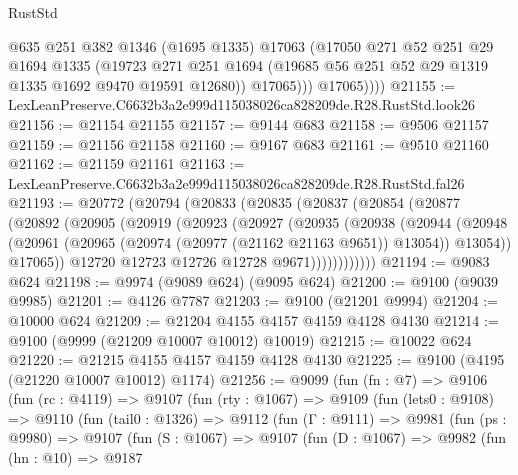 \begin{lexlean}{RustStd}
\begin{coremodule}
                @635
                @251
                @382
                @1346
                (@1695 @1335)
                @17063
                (@17050
                  @271
                  @52
                  @251
                  @29
                  @1694
                  @1335
                  (@19723
                    @271
                    @251
                    @1694
                    (@19685 @56 @251 @52 @29 @1319 @1335 @1692 @9470 @19591 @12680))
                  @17065)))
            @17065))))
@21155 := LexLeanPreserve.C6632b3a2e999d115038026ca828209de.R28.RustStd.look26
@21156 := @21154 @21155
@21157 := @9144 @683
@21158 := @9506 @21157
@21159 := @21156 @21158
@21160 := @9167 @683
@21161 := @9510 @21160
@21162 := @21159 @21161
@21163 := LexLeanPreserve.C6632b3a2e999d115038026ca828209de.R28.RustStd.fal26
@21193 := @20772
    (@20794
      (@20833
        (@20835
          (@20837
            (@20854
              (@20877
                (@20892
                  (@20905
                    (@20919
                      (@20923
                        (@20927
                          (@20935
                            (@20938
                              (@20944
                                (@20948
                                  (@20961
                                    (@20965 (@20974 (@20977 (@21162 @21163 @9651)) @13054))
                                    @13054))
                                @17065))
                            @12720
                            @12723
                            @12726
                            @12728
                            @9671))))))))))))
@21194 := @9083 @624
@21198 := @9974 (@9089 @624) (@9095 @624)
@21200 := @9100 (@9039 @9985)
@21201 := @4126 @7787
@21203 := @9100 (@21201 @9994)
@21204 := @10000 @624
@21209 := @21204 @4155 @4157 @4159 @4128 @4130
@21214 := @9100 (@9999 (@21209 @10007 @10012) @10019)
@21215 := @10022 @624
@21220 := @21215 @4155 @4157 @4159 @4128 @4130
@21225 := @9100 (@4195 (@21220 @10007 @10012) @1174)
@21256 := @9099
    (fun (fn : @7) =>
    @9106
      (fun (rc : @4119) =>
      @9107
        (fun (rty : @1067) =>
        @9109
          (fun (lets0 : @9108) =>
          @9110
            (fun (tail0 : @1326) =>
            @9112
              (fun (Γ : @9111) =>
              @9981
                (fun (ps : @9980) =>
                @9107
                  (fun (S : @1067) =>
                  @9107
                    (fun (D : @1067) =>
                    @9982
                      (fun (hn : @10) =>
                      @9187

\end{coremodule}
\end{lexlean}
